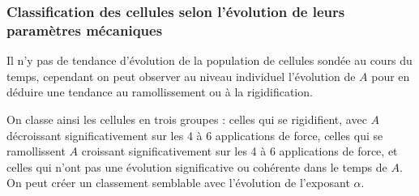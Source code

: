 \subsubsection{Classification des cellules selon l'évolution de leurs paramètres mécaniques}

Il n'y pas de tendance d'évolution de la population de cellules sondée au cours du temps, cependant on peut observer au niveau individuel l'évolution de $A$ pour en déduire une tendance au ramollissement ou à la rigidification. 

On classe ainsi les cellules en trois groupes : celles qui se rigidifient, avec $A$ décroissant significativement sur les 4 à 6 applications de force, celles qui se ramollissent $A$ croissant significativement sur les 4 à 6 applications de force, et celles qui n'ont pas une évolution significative ou cohérente dans le temps de $A$. 
On peut créer un classement semblable avec l'évolution de l'exposant $\alpha$. 

